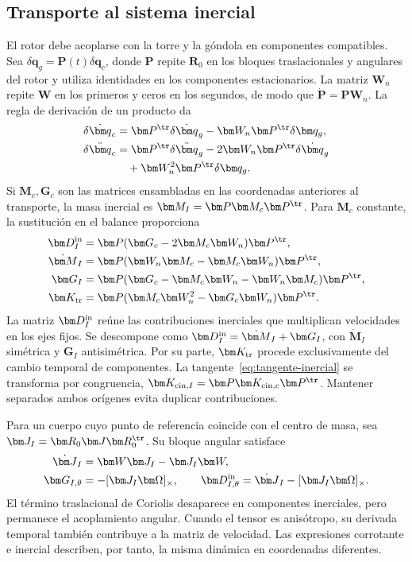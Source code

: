 \subsection{Transporte al sistema inercial}
El rotor debe acoplarse con la torre y la góndola en componentes compatibles. Sea $\delta\bm q_g=\bm P(t)\delta\bm q_c$, donde $\bm P$ repite $\bm R_0$ en los bloques traslacionales y angulares del rotor y utiliza identidades en los componentes estacionarios. La matriz $\bm W_n$ repite $\bm W$ en los primeros y ceros en los segundos, de modo que $\dot{\bm P}=\bm P\bm W_n$. La regla de derivación de un producto da
\begin{align}
\delta\dot{\bm q}_c
&=\bm P^\tr\delta\dot{\bm q}_g-\bm W_n\bm P^\tr\delta\bm q_g,\nonumber\\
\delta\ddot{\bm q}_c
&=\bm P^\tr\delta\ddot{\bm q}_g-2\bm W_n\bm P^\tr\delta\dot{\bm q}_g\nonumber\\
&\quad+\bm W_n^2\bm P^\tr\delta\bm q_g.
\end{align}
Si $\bm M_c,\bm G_c$ son las matrices ensambladas en las coordenadas anteriores al transporte, la masa inercial es $\bm M_I=\bm P\bm M_c\bm P^\tr$. Para $\bm M_c$ constante, la sustitución en el balance proporciona
\begin{align}
\bm D_I^{\rm in}&=\bm P(\bm G_c-2\bm M_c\bm W_n)\bm P^\tr,\nonumber\\
\dot{\bm M}_I&=\bm P(\bm W_n\bm M_c-\bm M_c\bm W_n)\bm P^\tr,\nonumber\\
\bm G_I&=\bm P(\bm G_c-\bm M_c\bm W_n-\bm W_n\bm M_c)\bm P^\tr,\label{eq:transportG}\\
\bm K_{\rm tr}&=\bm P(\bm M_c\bm W_n^2-\bm G_c\bm W_n)\bm P^\tr.
\label{eq:transportK}
\end{align}
La matriz $\bm D_I^{\rm in}$ reúne las contribuciones inerciales que multiplican velocidades en los ejes fijos. Se descompone como $\bm D_I^{\rm in}=\dot{\bm M}_I+\bm G_I$, con $\dot{\bm M}_I$ simétrica y $\bm G_I$ antisimétrica. Por su parte, $\bm K_{\rm tr}$ procede exclusivamente del cambio temporal de componentes. La tangente~\eqref{eq:tangente-inercial} se transforma por congruencia, $\bm K_{{\rm cin},I}=\bm P\bm K_{{\rm cin},c}\bm P^\tr$. Mantener separados ambos orígenes evita duplicar contribuciones.

Para un cuerpo cuyo punto de referencia coincide con el centro de masa, sea $\bm J_I=\bm R_0\bm J\bm R_0^\tr$. Su bloque angular satisface
\begin{align}
\dot{\bm J}_I&=\bm W\bm J_I-\bm J_I\bm W,\nonumber\\
\bm G_{I,\theta}&=-[\bm J_I\bm\Omega]_\times,\qquad
\bm D_{I,\theta}^{\rm in}=\dot{\bm J}_I-[\bm J_I\bm\Omega]_\times.
\end{align}
El término traslacional de Coriolis desaparece en componentes inerciales, pero permanece el acoplamiento angular. Cuando el tensor es anisótropo, su derivada temporal también contribuye a la matriz de velocidad. Las expresiones corrotante e inercial describen, por tanto, la misma dinámica en coordenadas diferentes.

